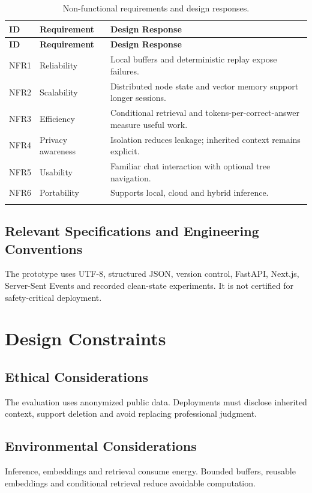 \begin{longtable}{p{}p{}p{}}
\caption{Non-functional requirements and design responses.}\label{tab:annexA_nonfunctional_requirements}\\
\toprule
\textbf{ID} & \textbf{Requirement} & \textbf{Design Response} \\
\midrule
\endfirsthead
\toprule
\textbf{ID} & \textbf{Requirement} & \textbf{Design Response} \\
\midrule
\endhead
NFR1 & Reliability & Local buffers and deterministic replay expose failures. \\
NFR2 & Scalability & Distributed node state and vector memory support longer sessions. \\
NFR3 & Efficiency & Conditional retrieval and tokens-per-correct-answer measure useful work. \\
NFR4 & Privacy awareness & Isolation reduces leakage; inherited context remains explicit. \\
NFR5 & Usability & Familiar chat interaction with optional tree navigation. \\
NFR6 & Portability & Supports local, cloud and hybrid inference. \\
\botrule
\end{longtable}

\subsection{Relevant Specifications and Engineering Conventions}
The prototype uses UTF-8, structured JSON, version control, FastAPI, Next.js, Server-Sent Events and recorded clean-state experiments. It is not certified for safety-critical deployment.

\section{Design Constraints}

\subsection{Ethical Considerations}
The evaluation uses anonymized public data. Deployments must disclose inherited context, support deletion and avoid replacing professional judgment.

\subsection{Environmental Considerations}
Inference, embeddings and retrieval consume energy. Bounded buffers, reusable embeddings and conditional retrieval reduce avoidable computation.

